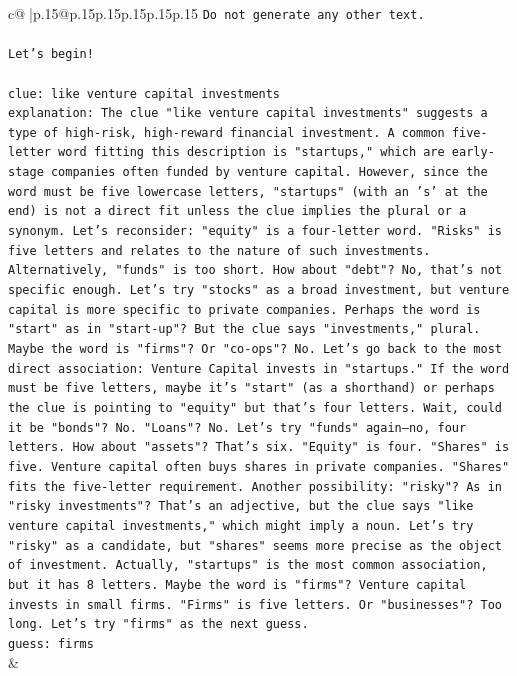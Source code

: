 \documentclass{article}
\begin{document}
{\begin{supertabular}{c@{$\;$}|p{.15\linewidth}@{}p{.15\linewidth}p{.15\linewidth}p{.15\linewidth}p{.15\linewidth}p{.15\linewidth}}
{{{\texttt{Do not generate any other text.} \\
\\ 
\texttt{Let's begin!} \\
\\ 
\texttt{clue: like venture capital investments} \\
\texttt{explanation: The clue "like venture capital investments" suggests a type of high{-}risk, high{-}reward financial investment. A common five{-}letter word fitting this description is "startups," which are early{-}stage companies often funded by venture capital. However, since the word must be five lowercase letters, "startups" (with an 's' at the end) is not a direct fit unless the clue implies the plural or a synonym. Let's reconsider: "equity" is a four{-}letter word. "Risks" is five letters and relates to the nature of such investments. Alternatively, "funds" is too short. How about "debt"? No, that's not specific enough. Let's try "stocks" as a broad investment, but venture capital is more specific to private companies. Perhaps the word is "start" as in "start{-}up"? But the clue says "investments," plural. Maybe the word is "firms"? Or "co{-}ops"? No. Let's go back to the most direct association: Venture Capital invests in "startups." If the word must be five letters, maybe it's "start" (as a shorthand) or perhaps the clue is pointing to "equity" but that's four letters. Wait, could it be "bonds"? No. "Loans"? No. Let's try "funds" again—no, four letters. How about "assets"? That's six. "Equity" is four. "Shares" is five. Venture capital often buys shares in private companies. "Shares" fits the five{-}letter requirement. Another possibility: "risky"? As in "risky investments"? That's an adjective, but the clue says "like venture capital investments," which might imply a noun. Let's try "risky" as a candidate, but "shares" seems more precise as the object of investment. Actually, "startups" is the most common association, but it has 8 letters. Maybe the word is "firms"? Venture capital invests in small firms. "Firms" is five letters. Or "businesses"? Too long. Let's try "firms" as the next guess.} \\
\texttt{guess: firms} \\
            }
        }
    }
    & \\ \\


\end{supertabular}}
\end{document}
